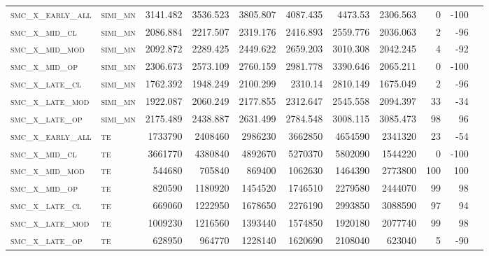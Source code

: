 \begin{landscape}
\begin{center}
\begin{footnotesize}
\begin{longtable}{llrrrrrr|rrr}
\textsc{smc\_x\_early\_all} & \textsc{simi\_mn  }   & 3141.482   & 3536.523   & 3805.807   & 4087.435   & 4473.53    & 2306.563   & 0     & -100   \\
\textsc{smc\_x\_mid\_cl   } & \textsc{simi\_mn  }   & 2086.884   & 2217.507   & 2319.176   & 2416.893   & 2559.776   & 2036.063   & 2     & -96    \\
\textsc{smc\_x\_mid\_mod  } & \textsc{simi\_mn  }   & 2092.872   & 2289.425   & 2449.622   & 2659.203   & 3010.308   & 2042.245   & 4     & -92    \\
\textsc{smc\_x\_mid\_op   } & \textsc{simi\_mn  }   & 2306.673   & 2573.109   & 2760.159   & 2981.778   & 3390.646   & 2065.211   & 0     & -100   \\
\textsc{smc\_x\_late\_cl  } & \textsc{simi\_mn  }   & 1762.392   & 1948.249   & 2100.299   & 2310.14    & 2810.149   & 1675.049   & 2     & -96    \\
\textsc{smc\_x\_late\_mod } & \textsc{simi\_mn  }   & 1922.087   & 2060.249   & 2177.855   & 2312.647   & 2545.558   & 2094.397   & 33    & -34    \\
\textsc{smc\_x\_late\_op  } & \textsc{simi\_mn  }   & 2175.489   & 2438.887   & 2631.499   & 2784.548   & 3008.115   & 3085.473   & 98    & 96     \\
\textsc{smc\_x\_early\_all} & \textsc{te  	    }   & 1733790    & 2408460    & 2986230    & 3662850    & 4654590    & 2341320    & 23    & -54    \\
\textsc{smc\_x\_mid\_cl   } & \textsc{te        }   & 3661770    & 4380840    & 4892670    & 5270370    & 5802090    & 1544220    & 0     & -100   \\
\textsc{smc\_x\_mid\_mod  } & \textsc{te        }   & 544680     & 705840     & 869400     & 1062630    & 1464390    & 2773800    & 100   & 100    \\
\textsc{smc\_x\_mid\_op   } & \textsc{te        }   & 820590     & 1180920    & 1454520    & 1746510    & 2279580    & 2444070    & 99    & 98     \\
\textsc{smc\_x\_late\_cl  } & \textsc{te        }   & 669060     & 1222950    & 1678650    & 2276190    & 2993850    & 3088590    & 97    & 94     \\
\textsc{smc\_x\_late\_mod } & \textsc{te        }   & 1009230    & 1216560    & 1393440    & 1574850    & 1920180    & 2077740    & 99    & 98     \\
\textsc{smc\_x\_late\_op  } & \textsc{te        }   & 628950     & 964770     & 1228140    & 1620690    & 2108040    & 623040     & 5     & -90    

\end{longtable}
\end{footnotesize}
\end{center}
\end{landscape}

\restoregeometry
\pagestyle{headings}
